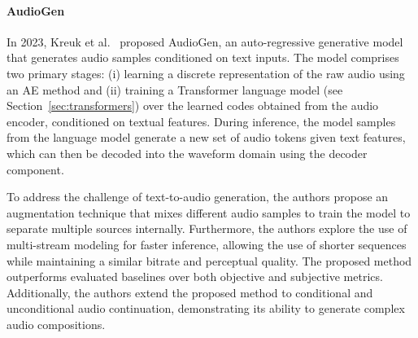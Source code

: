 \paragraph{AudioGen} \label{sec:audiogen}

In 2023, Kreuk et al.~\cite{kreuk_audiogen_2023} proposed AudioGen, an auto-regressive generative model that generates audio samples conditioned on text inputs. The model comprises two primary stages: (i) learning a discrete representation of the raw audio using an \ac{AE} method and (ii) training a Transformer language model (see Section~\ref{sec:transformers}) over the learned codes obtained from the audio encoder, conditioned on textual features. During inference, the model samples from the language model generate a new set of audio tokens given text features, which can then be decoded into the waveform domain using the decoder component.

To address the challenge of text-to-audio generation, the authors propose an augmentation technique that mixes different audio samples to train the model to separate multiple sources internally. Furthermore, the authors explore the use of multi-stream modeling for faster inference, allowing the use of shorter sequences while maintaining a similar bitrate and perceptual quality. The proposed method outperforms evaluated baselines over both objective and subjective metrics. Additionally, the authors extend the proposed method to conditional and unconditional audio continuation, demonstrating its ability to generate complex audio compositions.